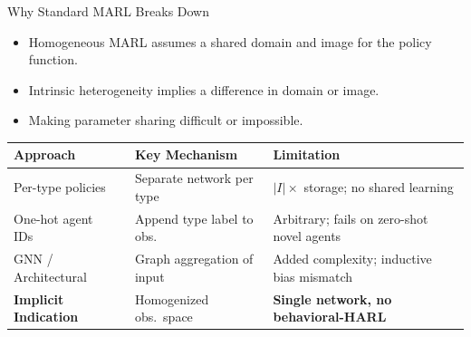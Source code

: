\begin{frame}{Why Standard MARL Breaks Down}
    \begin{itemize}
        \item Homogeneous MARL assumes a shared domain and image for the policy function.
        \item Intrinsic heterogeneity implies a difference in domain or image.
        \item Making parameter sharing difficult or impossible.
    \end{itemize}
    \begin{center}
    \renewcommand{\arraystretch}{1.4}
    \footnotesize
    \begin{tabular}{@{} l l l @{}}
        \toprule
        \textbf{Approach} & \textbf{Key Mechanism} & \textbf{Limitation} \\
        \midrule
        Per-type policies~\cite{papoudakis2021} & Separate network per type
            & $|{I}|\times$ storage; no shared learning \\
        One-hot agent IDs~\cite{terry2020} & Append type label to obs.
            & Arbitrary; fails on zero-shot novel agents \\
        GNN / Architectural~\cite{liu2020b} & Graph aggregation of input
            & Added complexity; inductive bias mismatch \\
        \textbf{Implicit Indication} & Homogenized obs.\ space
            & \textbf{Single network, no behavioral-HARL} \\
        \bottomrule
    \end{tabular}
    \end{center}

\end{frame}


